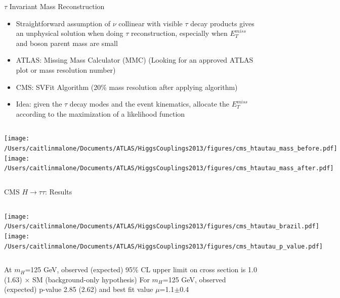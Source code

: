\documentclass{beamer}
\begin{document}
\begin{frame}{$\tau$ Invariant Mass Reconstruction}
	\begin{itemize} \scriptsize
		\item Straightforward assumption of $\nu$ collinear with visible $\tau$ decay products gives an unphysical solution when doing $\tau$ reconstruction, especially when $E_T^{miss}$ and boson parent mass are small
		\item ATLAS: Missing Mass Calculator (MMC) \textcolor{BrickRed}{(Looking for an approved ATLAS plot or mass resolution number)}
		\item CMS: SVFit Algorithm (20\% mass resolution after applying algorithm)
		\item Idea: given the $\tau$ decay modes and the event kinematics, allocate the $E_T^{miss}$ according to the maximization of a likelihood function
	\end{itemize}
	\begin{columns}
			\texttt{[image: /Users/caitlinmalone/Documents/ATLAS/HiggsCouplings2013/figures/cms\_htautau\_mass\_before.pdf]}		
			\texttt{[image: /Users/caitlinmalone/Documents/ATLAS/HiggsCouplings2013/figures/cms\_htautau\_mass\_after.pdf]}	
	\end{columns}
\end{frame}






\begin{frame}{CMS $H\rightarrow \tau \tau$: Results}
	\begin{columns}[c]
		\column{0.5\textwidth}
			\texttt{[image: /Users/caitlinmalone/Documents/ATLAS/HiggsCouplings2013/figures/cms\_htautau\_brazil.pdf]}\\
		\column{0.5\textwidth}
			\texttt{[image: /Users/caitlinmalone/Documents/ATLAS/HiggsCouplings2013/figures/cms\_htautau\_p\_value.pdf]}\\
	\end{columns}	
	\vspace{0.5cm}
	\begin{columns}
			\scriptsize 
			At $m_H$=125 GeV, observed (expected) 95\% CL upper limit on cross section is 1.0 (1.63) $\times$ SM (background-only hypothesis)
			\scriptsize
			For $m_H$=125 GeV, observed (expected) p-value 2.85 (2.62) and best fit value $\mu$=1.1$\pm$0.4 
	\end{columns}	

\end{frame}
\end{document}
